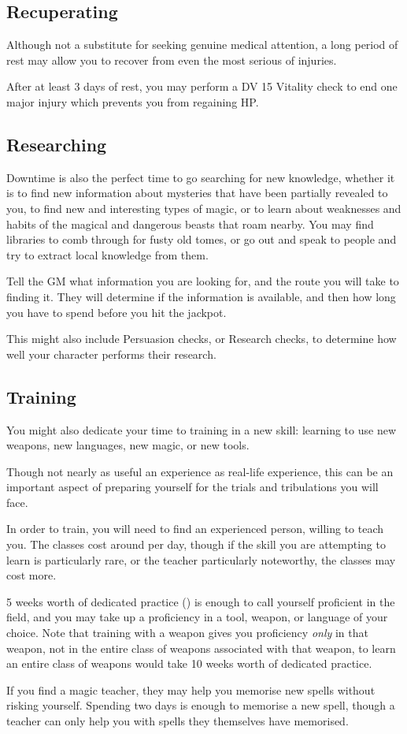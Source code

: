 \subsection{Recuperating}

Although not a substitute for seeking genuine medical attention, a long period of rest may allow you to recover from even the most serious of injuries. 

After at least 3 days of rest, you may perform a DV 15 Vitality check to end one major injury which prevents you from regaining HP. 


\subsection{Researching}

Downtime is also the perfect time to go searching for new knowledge, whether it is to find new information about mysteries that have been partially revealed to you, to find new and interesting types of magic, or to learn about weaknesses and habits of the magical and dangerous beasts that roam nearby. You may find libraries to comb through for fusty old tomes, or go out and speak to people and try to extract local knowledge from them. 

Tell the GM what information you are looking for, and the route you will take to finding it. They will determine if the information is available, and then how long you have to spend before you hit the jackpot. 

This might also include Persuasion checks, or Research checks, to determine how well your character performs their research. 
 

\subsection{Training}

You might also dedicate your time to training in a new skill: learning to use new weapons, new languages, new magic, or new tools. 

Though not nearly as useful an experience as real-life experience, this can be an important aspect of preparing yourself for the trials and tribulations you will face. 

In order to train, you will need to find an experienced person, willing to teach you. The classes cost around  per day, though if the skill you are attempting to learn is particularly rare, or the teacher particularly noteworthy, the classes may cost more.  

5 weeks worth of dedicated practice () is enough to call yourself proficient in the field, and you may take up a proficiency in a tool, weapon, or language of your choice. Note that training with a weapon gives you proficiency {\it only} in that weapon, not in the entire class of weapons associated with that weapon, to learn an entire class of weapons would take 10 weeks worth of dedicated practice. 

If you find a magic teacher, they may help you memorise new spells without risking yourself. Spending two days is enough to memorise a new spell, though a teacher can only help you with spells they themselves have memorised. 
